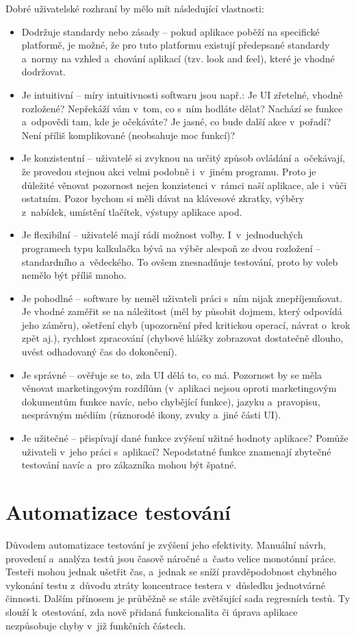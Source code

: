 		Dobré uživatelské rozhraní by mělo mít následující vlastnosti:
			\begin{itemize}
				\item Dodržuje standardy nebo zásady -- pokud aplikace poběží na specifické platformě, je možné, že pro tuto platformu existují předepsané standardy a~normy na vzhled a~chování aplikací (tzv. look and feel), které je vhodné dodržovat.
				\item Je intuitivní -- míry intuitivnosti softwaru jsou např.: Je UI zřetelné, vhodně rozložené? Nepřekáží vám v~tom, co s~ním hodláte dělat? Nachází se funkce a~odpovědi tam, kde je očekáváte? Je jasné, co bude další akce v~pořadí? Není příliš komplikované (neobsahuje moc funkcí)?
				\item Je konzistentní -- uživatelé si zvyknou na určitý způsob ovládání a~očekávají, že provedou stejnou akci velmi podobně i~v~jiném programu. Proto je důležité věnovat pozornost nejen konzistenci v~rámci naší aplikace, ale i~vůči ostatním. Pozor bychom si měli dávat na klávesové zkratky, výběry z~nabídek, umístění tlačítek, výstupy aplikace apod.
				\item Je flexibilní -- uživatelé mají rádi možnost volby. I~v~jednoduchých programech typu kalkulačka bývá na výběr alespoň ze dvou rozložení -- standardního a~vědeckého. To ovšem znesnadňuje testování, proto by voleb nemělo být příliš mnoho.
				\item Je pohodlné -- software by neměl uživateli práci s~ním nijak znepříjemňovat. Je vhodné zaměřit se na náležitost (měl by působit dojmem, který odpovídá jeho záměru), ošetření chyb (upozornění před kritickou operací, návrat o~krok zpět aj.), rychlost zpracování (chybové hlášky zobrazovat dostatečně dlouho, uvést odhadovaný čas do dokončení).
				\item Je správné -- ověřuje se to, zda UI dělá to, co má. Pozornost by se měla věnovat marketingovým rozdílům (v~aplikaci nejsou oproti marketingovým dokumentům funkce navíc, nebo chybějící funkce), jazyku a~pravopisu, nesprávným médiím (různorodé ikony, zvuky a~jiné části UI).
				\item Je užitečné -- přispívají dané funkce zvýšení užitné hodnoty aplikace? Pomůže uživateli v~jeho práci s~aplikací? Nepodstatné funkce znamenají zbytečné testování navíc a~pro zákazníka mohou být špatné.
			\end{itemize}
		
		\section{Automatizace testování}
		Důvodem automatizace testování je zvýšení jeho efektivity. Manuální návrh, provedení a~analýza testů jsou časově náročné a~často velice monotónní práce. Testeři mohou jednak ušetřit čas, a~jednak se sníží pravděpodobnost chybného vykonání testu z~důvodu ztráty koncentrace testera v~důsledku jednotvárné činnosti. Dalším přínosem je průběžně se stále zvětšující sada regresních testů. Ty slouží k~otestování, zda nově přidaná funkcionalita či úprava aplikace nezpůsobuje chyby v~již funkčních částech.
		
